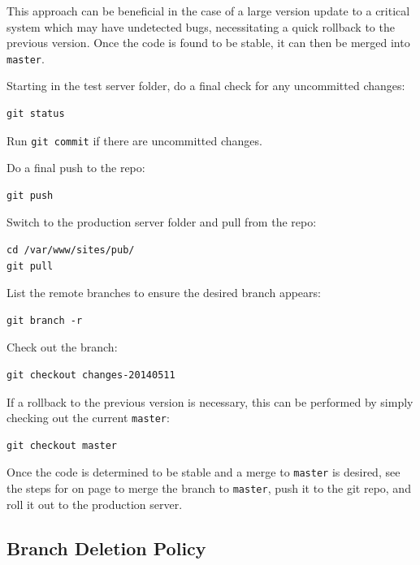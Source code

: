 \documentclass[pdflatex,letterpaper,twoside,12pt]{book}
\begin{document}
This approach can be beneficial in the case of a large version update to a critical system which may have undetected bugs, necessitating a quick rollback to the previous version.  Once the code is found to be stable, it can then be merged into \texttt{master}.

Starting in the test server folder, do a final check for any uncommitted changes:

\begin{verbatim}
git status
\end{verbatim}

Run \texttt{git commit} if there are uncommitted changes.

Do a final push to the repo:

\begin{verbatim}
git push
\end{verbatim}

Switch to the production server folder and pull from the repo:

\begin{verbatim}
cd /var/www/sites/pub/
git pull
\end{verbatim}

List the remote branches to ensure the desired branch appears:

\begin{verbatim}
git branch -r
\end{verbatim}

Check out the branch:

\begin{verbatim}
git checkout changes-20140511
\end{verbatim}

If a rollback to the previous version is necessary, this can be performed by simply checking out the current \texttt{master}:

\begin{verbatim}
git checkout master
\end{verbatim}

Once the code is determined to be stable and a merge to \texttt{master} is desired, see the steps for  on page \pageref{publish-plan-a} to merge the branch to \texttt{master}, push it to the git repo, and roll it out to the production server.

\subsection{Branch Deletion Policy}
\end{document}
